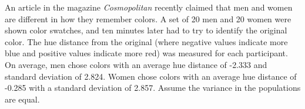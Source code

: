\documentclass[11pt]{exam}
\begin{document}
\begin{questions}



%
%

  \question An article in the magazine \emph{Cosmopolitan} recently claimed
  that men and women are different in how they remember colors.  A set of
  20 men and 20 women were shown color swatches, and ten minutes later had
  to try to identify the original color.  The hue distance from the
  original (where negative values indicate more blue and positive values
  indicate more red) was measured for each participant.  On average, men
  chose colors with an average hue distance of
-2.333 and standard deviation of 
2.824.  Women chose colors with an average hue distance of 
-0.285 with a standard deviation of 
2.857.  Assume the variance in the populations are equal.
  \begin{parts}

\end{parts}
\end{questions}
\end{document}
